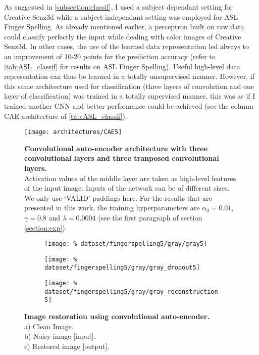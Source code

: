 As suggested in \ref{subsection:classif}, I used a subject dependant setting
for Creative Senz3d while a subject independant setting was employed
for ASL Finger Spelling. As already mentioned earlier, a perceptron built
on raw data could classify perfectly the input while dealing with color
images of Creative Senz3d. In other cases, the use of the learned
data representation led always to an improvement of 10-20 points for
the prediction accuracy (refer to \autoref{tab:ASL_classif}
for results on ASL Finger Spelling). Useful high-level data representation
can thus be learned in a totally unsupervised manner.
However, if this same architecture used for classification (three layers
of convolution and one layer of classification) was trained in a
totally supervised manner, this was as if I trained another CNN and
better performance could be achieved (see the column CAE architecture
of \autoref{tab:ASL_classif}).

\vspace{-1em}
\begin{figure}[H]
  \centering
  \texttt{[image: architectures/CAE5]}
  \caption{%
    \textbf{Convolutional auto-encoder architecture with 
      three convolutional layers and three tranposed convolutional
      layers.}\\[0.1em]
    Activation values of the middle layer are taken as 
      high-level features of the input image. Inputs of the network
      can be of different sizes. We only use `VALID' paddings here.
      For the results that are presented in this work, the training
      hyperparameters are $\alpha_0 = 0.01$, $\gamma = 0.8$ and
      $\lambda = 0.0004$ (see the first paragraph of section
      \ref{section:exp}).
      }
  \label{fig:CAE5}
\end{figure}

\begin{figure}[H]
  \centering
  \hfill
  \begin{subfigure}{0.28\linewidth}
    \centering
    \texttt{[image: \%
      dataset/fingerspelling5/gray/gray5]}
    \caption{}
  \end{subfigure}
  \hfill
  \begin{subfigure}{0.28\linewidth}
    \centering
    \texttt{[image: \%
      dataset/fingerspelling5/gray/gray\_dropout5]}
    \caption{}
  \end{subfigure}
  \hfill
  \begin{subfigure}{0.28\linewidth}
    \centering
    \texttt{[image: \%
      dataset/fingerspelling5/gray/gray\_reconstruction5]}
    \caption{}
  \end{subfigure}
  \caption{%
    \textbf{Image restoration using convolutional auto-encoder.}\\[0.1em]
      a) Clean Image.\\[0.1em]
      b) Noisy image [input].\\[0.1em]
      c) Restored image [output].}
  \label{fig:image_restoration}
\end{figure}

